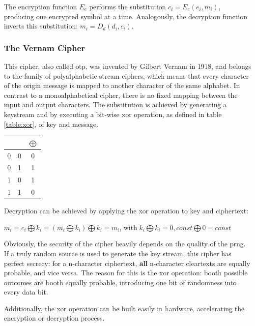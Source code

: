 The encryption function $E_e$ performs the substitution $c_i = E_e(e_i, m_i)$, producing one encrypted symbol at a time. Analogously,
the decryption function inverts this substitution: $m_i = D_d(d_i, c_i)$.

\subsubsection{The Vernam Cipher} 

This cipher, also called \gls{otp}, was invented by Gilbert Vernam in 1918, and belongs to the family of polyalphabetic stream ciphers,
which means that every character of the origin message is mapped to another character of the same alphabet. In contrast to a monoalphabetical cipher,
there is no fixed mapping between the input and output characters.
The substitution is achieved by generating a keystream and by executing 
a bit-wise \gls{xor} operation, as defined in table \ref{table:xor}, of key and message.

\begin{center}
\begin{tabular}{ c c | c }
 \label{table:xor}
   &  & $\bigoplus$ \\ \hline
  0 & 0 & 0 \\
  0 & 1 & 1 \\
  1 & 0 & 1 \\
  1 & 1 & 0 \\
\end{tabular}
\end{center}

Decryption can be achieved by applying the \gls{xor} operation to key and ciphertext:

\begin{center}
 $m_i = c_i \bigoplus k_i = (m_i \bigoplus k_i) \bigoplus k_i = m_i$, with $ k_i \bigoplus k_i = 0, const \bigoplus 0 = const$
\end{center}


Obviously, the security of the cipher heavily depends on the quality of the \gls{prng}. If a truly random source is used to generate the key stream, this cipher
has perfect secrecy: for a n-character ciphertext, \textbf{all} n-character cleartexts are equally probable, and vice versa. 
The reason for this is the \gls{xor} operation: booth possible outcomes are booth equally probable, introducing one bit of randomness into every data bit. 

Additionally, the \gls{xor} operation can be built easily in hardware, accelerating the encryption or decryption process.

